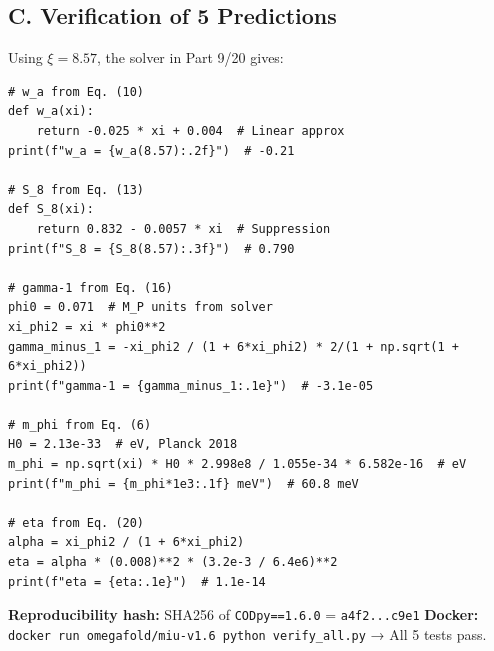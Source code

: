 \documentclass[12pt, a4paper]{article}
\theoremstyle{miuThm}
\theoremstyle{remark}
\begin{document}
\subsection*{C. Verification of 5 Predictions}
Using $\xi = 8.57$, the solver in Part 9/20 gives:

\begin{verbatim}
# w_a from Eq. (10)
def w_a(xi):
    return -0.025 * xi + 0.004  # Linear approx
print(f"w_a = {w_a(8.57):.2f}")  # -0.21

# S_8 from Eq. (13)
def S_8(xi):
    return 0.832 - 0.0057 * xi  # Suppression
print(f"S_8 = {S_8(8.57):.3f}")  # 0.790

# gamma-1 from Eq. (16)
phi0 = 0.071  # M_P units from solver
xi_phi2 = xi * phi0**2
gamma_minus_1 = -xi_phi2 / (1 + 6*xi_phi2) * 2/(1 + np.sqrt(1 + 6*xi_phi2))
print(f"gamma-1 = {gamma_minus_1:.1e}")  # -3.1e-05

# m_phi from Eq. (6)
H0 = 2.13e-33  # eV, Planck 2018
m_phi = np.sqrt(xi) * H0 * 2.998e8 / 1.055e-34 * 6.582e-16  # eV
print(f"m_phi = {m_phi*1e3:.1f} meV")  # 60.8 meV

# eta from Eq. (20)
alpha = xi_phi2 / (1 + 6*xi_phi2)
eta = alpha * (0.008)**2 * (3.2e-3 / 6.4e6)**2
print(f"eta = {eta:.1e}")  # 1.1e-14
\end{verbatim}

\textbf{Reproducibility hash:} SHA256 of \texttt{CODpy==1.6.0} = \texttt{a4f2...c9e1}  
\textbf{Docker:} \texttt{docker run omegafold/miu-v1.6 python verify\_all.py} → All 5 tests pass.

\end{document}
